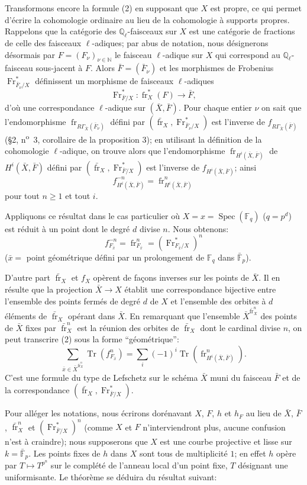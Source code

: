 \documentclass[11pt]{article}
\DeclareMathOperator{\Spec}{Spec}
\providecommand{\Tr}{\operatorname{Tr}}
\providecommand{\Tr}{\operatorname{Tr}}
\providecommand{\Tr}{\operatorname{Tr}}
\providecommand{\Tr}{\operatorname{Tr}}
\providecommand{\Spec}{\operatorname{Spec}}
\providecommand{\Spec}{\operatorname{Spec}}
\providecommand{\Spec}{\operatorname{Spec}}
\providecommand{\Tr}{\operatorname{Tr}}
\providecommand{\fr}{\operatorname{fr}}
\providecommand{\Fr}{\operatorname{Fr}}
\providecommand{\Fr}{\operatorname{Fr}}
\providecommand{\fr}{\operatorname{fr}}
\providecommand{\Spec}{\operatorname{Spec}}
\begin{document}
Transformons encore la formule (2) en supposant que $X$ est propre, ce qui permet d'écrire la cohomologie ordinaire au lieu de la cohomologie à supports propres. Rappelons que la catégorie des $\mathbb Q_\ell$-faisceaux sur $X$ est une catégorie de fractions de celle des faisceaux $\ell$-adiques; par abus de notation, nous désignerons désormais par $F=(F_\nu)_{\nu\in\mathbb N}$ le faisceau $\ell$-adique sur $X$ qui correspond au $\mathbb Q_\ell$-faisceau sous-jacent à $F$. Alors $\bar F=(\bar F_\nu)$ et les morphismes de Frobenius $\Fr^*_{\bar F_\nu/X}$ définissent un morphisme de faisceaux $\ell$-adiques
\[
\Fr^*_{\bar F/X}:\fr_X^*(F)\longrightarrow\bar F,
\]
d'où une correspondance $\ell$-adique sur $(\bar X,\bar F)$. Pour chaque entier $\nu$ on sait que l'endomorphisme $\fr_{R\Gamma_{\bar X}(\bar F_\nu)}$ défini par $(\bar{\fr}_X,\Fr^*_{\bar F_\nu/X})$ est l'inverse de $f_{R\Gamma_{\bar X}(\bar F)}$ (§2, n\textsuperscript{o}~3, corollaire de la proposition 3); en utilisant la définition de la cohomologie $\ell$-adique, on trouve alors que l'endomorphisme $\fr_{H^i(\bar X,\bar F)}$ de $H^i(\bar X,\bar F)$ défini par $(\bar{\fr}_X,\Fr^*_{\bar F/X})$ est l'inverse de $f_{H^i(\bar X,\bar F)}$; ainsi
\[
f^{-n}_{H^i(\bar X,\bar F)}=\fr^n_{H^i(\bar X,\bar F)}
\]
pour tout $n\ge1$ et tout $i$.

Appliquons ce résultat dans le cas particulier où $X=x=\Spec(\mathbb F_q)$ ($q=p^d$) est réduit à un point dont le degré $d$ divise $n$. Nous obtenons:
\[
f^{-n}_{F_{\bar x}}=\fr^n_{F_{\bar x}}=(\Fr^*_{F_{\bar x}/X})^n
\]
($\bar x=$ point géométrique défini par un prolongement de $\mathbb F_q$ dans $\bar{\mathbb F}_p$).

D'autre part $\bar{\fr}_X$ et $f_X$ opèrent de façons inverses sur les points de $\bar X$. Il en résulte que la projection $\bar X\to X$ établit une correspondance bijective entre l'ensemble des points fermés de degré $d$ de $X$ et l'ensemble des orbites à $d$ éléments de $\bar{\fr}_X$ opérant dans $\bar X$. En remarquant que l'ensemble $\bar X^{\bar{\fr}_X^n}$ des points de $\bar X$ fixes par $\bar{\fr}_X^n$ est la réunion des orbites de $\bar{\fr}_X$ dont le cardinal divise $n$, on peut transcrire (2) sous la forme ``géométrique'':
\[
\sum_{\bar x\in\bar X^{\bar{\fr}_X^n}}\Tr(f_{F_{\bar x}}^n)
=\sum_i(-1)^i\Tr(\fr^n_{H^i(\bar X,\bar F)}).
\tag{2'}
\]
C'est une formule du type de Lefschetz sur le schéma $\bar X$ muni du faisceau $\bar F$ et de la correspondance $(\bar{\fr}_X,\Fr^*_{\bar F/X})$.

Pour alléger les notations, nous écrirons dorénavant $X$, $F$, $h$ et $h_F$ au lieu de $\bar X$, $\bar F$, $\bar{\fr}_X^n$ et $(\Fr^*_{\bar F/X})^n$ (comme $X$ et $F$ n'interviendront plus, aucune confusion n'est à craindre); nous supposerons que $X$ est une courbe projective et lisse sur $k=\bar{\mathbb F}_p$. Les points fixes de $h$ dans $X$ sont tous de multiplicité $1$; en effet $h$ opère par $T\mapsto T^{p^n}$ sur le complété de l'anneau local d'un point fixe, $T$ désignant une uniformisante. Le théorème se déduira du résultat suivant:
\end{document}
